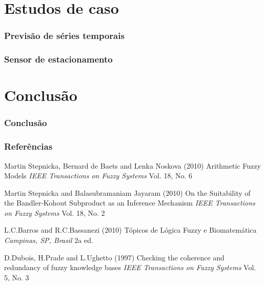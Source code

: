 \documentclass{beamer}
\theoremstyle{definition}
\begin{document}

\section{Estudos de caso}


\begin{frame}
\frametitle{Previsão de séries temporais}
\end{frame}

\begin{frame}
\frametitle{Sensor de estacionamento}
\end{frame}

\section{Conclusão}

\begin{frame}
\frametitle{Conclusão}
\end{frame}




\begin{frame}
\frametitle{Referências}
\footnotesize{
\begin{thebibliography}{99} %
 Martin Stepnicka, Bernard de Baets and Lenka Noskova (2010)
\newblock Arithmetic Fuzzy Models
\newblock \emph{IEEE Transactions on Fuzzy Systems} Vol. 18, No. 6

 Martin Stepnicka and Balasubramaniam Jayaram (2010)
\newblock On the Suitability of the Bandler-Kohout Subproduct as an Inference Mechanism
\newblock \emph{IEEE Transactions on Fuzzy Systems} Vol. 18, No. 2

 L.C.Barros and R.C.Bassanezi (2010)
\newblock Tópicos de Lógica Fuzzy e Biomatemática
\newblock \emph{Campinas, SP, Brasil} 2a ed.

 D.Dubois, H.Prade and L.Ughetto (1997)
\newblock Checking the coherence and redundancy of fuzzy knowledge bases
\newblock \emph{IEEE Transactions on Fuzzy Systems} Vol. 5, No. 3
\end{thebibliography}
}
\end{frame}
\end{document}
